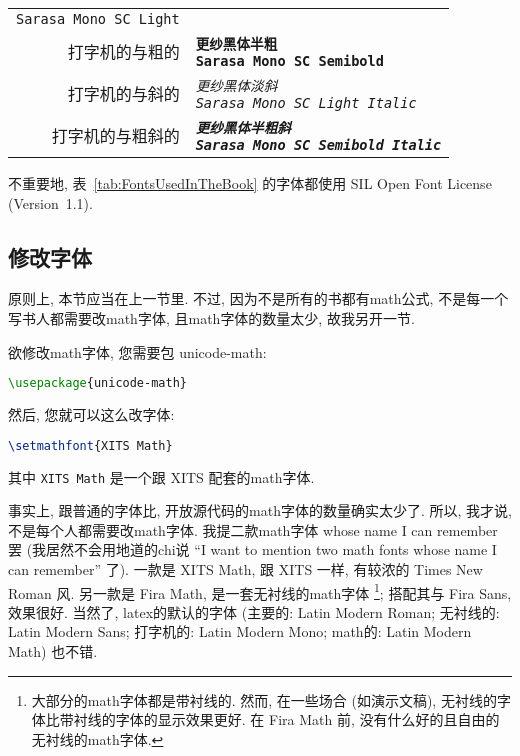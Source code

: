 \begin{longtable}[c]{r|l}
{    \texttt{\textup{Sarasa Mono SC Light}}}                    \\
    打字机的与粗的  &
    \makecell{\texttt{\textbf{更纱黑体半粗}}                         \\
    \texttt{\textbf{Sarasa Mono SC Semibold}}}                 \\
    打字机的与斜的  &
    \makecell{\texttt{\textit{更纱黑体淡斜}}                         \\
    \texttt{\textit{Sarasa Mono SC Light Italic}}}             \\
    打字机的与粗斜的 &
    \makecell{\texttt{\textbf{\textit{更纱黑体半粗斜}}}               \\
    \texttt{\textbf{\textit{Sarasa Mono SC Semibold Italic}}}} \\
\end{longtable}

不重要地, 表~\ref{tab:FontsUsedInTheBook}
的字体都使用 SIL Open Font License (Version~1.1).

\subsection{修改字体}

原则上, 本节应当在上一节里.
不过, 因为不是所有的书都有\gls{math}公式,
不是每一个写书人都需要改\gls{math}字体,
且\gls{math}字体的数量太少,
故我另开一节.

欲修改\gls{math}字体, 您需要包 \textsf{unicode-math}:
\begin{lstlisting}[language=TeX]
\usepackage{unicode-math}
\end{lstlisting}
然后, 您就可以这么改字体:
\begin{lstlisting}[language=TeX]
\setmathfont{XITS Math}
\end{lstlisting}
其中 \verb`XITS Math` 是一个跟 XITS 配套的\gls{math}字体.

事实上, 跟普通的字体比,
开放源代码的\gls{math}字体的数量确实太少了.
所以, 我才说, 不是每个人都需要改\gls{math}字体.
我提二款\gls{math}字体
whose name I can remember 罢
(我居然不会用地道的\gls{chi}说
``I want to mention two math fonts
whose name I can remember'' 了).
一款是 XITS Math, 跟 XITS 一样, 有较浓的 Times New Roman 风.
另一款是 Fira Math, 是一套无衬线的\gls{math}字体%
\footnote{大部分的\gls{math}字体都是带衬线的.
    然而, 在一些场合 (如演示文稿),
    无衬线的字体比带衬线的字体的显示效果更好.
    在 Fira Math 前,
    没有什么好的且自由的无衬线的\gls{math}字体.};
搭配其与 Fira Sans, 效果很好.
当然了, \gls{latex}的默认的字体
(主要的: Latin Modern Roman;
无衬线的: Latin Modern Sans;
打字机的: Latin Modern Mono;
\gls{math}的: Latin Modern Math)
也不错.

